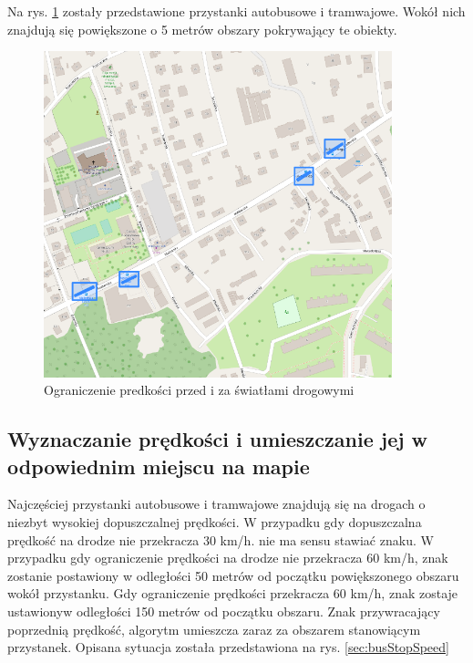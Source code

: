 Na rys. \ref{sec:busStopBorder} zostały przedstawione przystanki autobusowe i tramwajowe. Wokół nich znajdują się powiększone o 5 metrów obszary pokrywający te obiekty.
\begin{figure}[h]
\caption{Ograniczenie predkości przed i za światłami drogowymi}
\label{sec:busStopBorder}
\centering
\includegraphics[width=0.9\textwidth]{busStopBorder}
\end{figure}


\newpage
\subsection{Wyznaczanie prędkości i umieszczanie jej w odpowiednim miejscu na mapie}

Najczęściej przystanki autobusowe i tramwajowe znajdują się na drogach o niezbyt wysokiej dopuszczalnej prędkości. W przypadku gdy dopuszczalna prędkość na drodze nie przekracza 30 km/h. nie ma sensu stawiać znaku. W przypadku gdy ograniczenie prędkości na drodze nie przekracza 60 km/h, znak zostanie postawiony w odległości 50 metrów od początku powiększonego obszaru wokół przystanku. Gdy ograniczenie prędkości przekracza 60 km/h, znak zostaje ustawionyw odległości 150 metrów od początku obszaru. 
Znak przywracający poprzednią prędkość, algorytm umieszcza zaraz za obszarem stanowiącym przystanek. Opisana sytuacja została przedstawiona na rys. \ref{sec:busStopSpeed}

